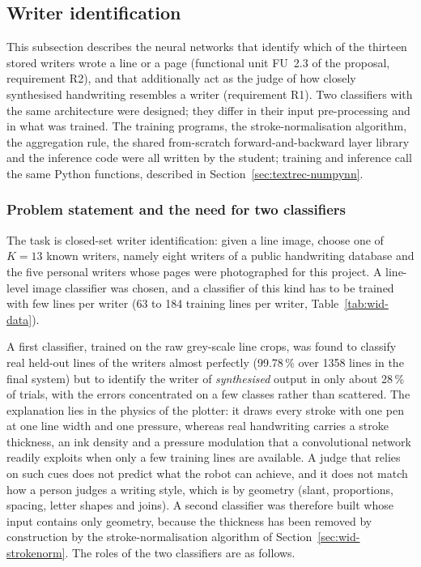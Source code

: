 \subsection{Writer identification}
\label{sec:writerid}

This subsection describes the neural networks that identify which of the thirteen stored writers wrote a line or a page (functional unit FU~2.3 of the proposal, requirement R2), and that additionally act as the judge of how closely synthesised handwriting resembles a writer (requirement R1).
Two classifiers with the same architecture were designed; they differ in their input pre-processing and in what was trained.
The training programs, the stroke-normalisation algorithm, the aggregation rule, the shared from-scratch forward-and-backward layer library and the inference code were all written by the student; training and inference call the same Python functions, described in Section~\ref{sec:textrec-numpynn}.

\subsubsection{Problem statement and the need for two classifiers}

The task is closed-set writer identification: given a line image, choose one of $K=13$ known writers, namely eight writers of a public handwriting database and the five personal writers whose pages were photographed for this project.
A line-level image classifier was chosen, and a classifier of this kind has to be trained with few lines per writer (63 to 184 training lines per writer, Table~\ref{tab:wid-data}).

A first classifier, trained on the raw grey-scale line crops, was found to classify real held-out lines of the writers almost perfectly (99.78\,\% over 1358 lines in the final system) but to identify the writer of \emph{synthesised} output in only about 28\,\% of trials, with the errors concentrated on a few classes rather than scattered.
The explanation lies in the physics of the plotter: it draws every stroke with one pen at one line width and one pressure, whereas real handwriting carries a stroke thickness, an ink density and a pressure modulation that a convolutional network readily exploits when only a few training lines are available.
A judge that relies on such cues does not predict what the robot can achieve, and it does not match how a person judges a writing style, which is by geometry (slant, proportions, spacing, letter shapes and joins).
A second classifier was therefore built whose input contains only geometry, because the thickness has been removed by construction by the stroke-normalisation algorithm of Section~\ref{sec:wid-strokenorm}.
The roles of the two classifiers are as follows.

